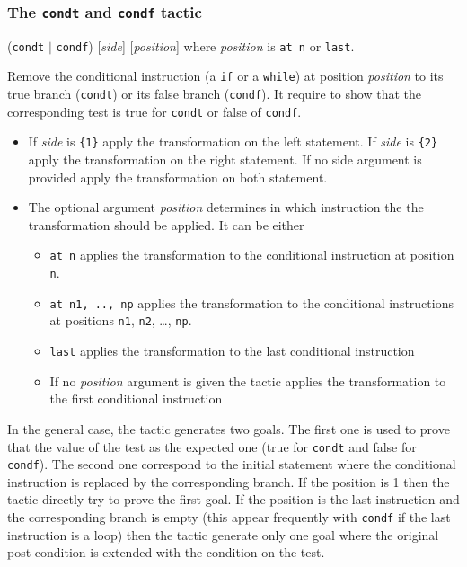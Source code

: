 \subsubsection{The \texttt{condt} and \texttt{condf} tactic}\label{tac:cond} \DONE

\Syntax (\verb+condt+ $|$ \verb+condf+) [\textit{side}] [\textit{position}] 
where \textit{position} is \verb+at n+ or \verb+last+.

\Description Remove the conditional instruction 
(a \verb+if+ or a \verb+while+) at position \textit{position} to
its true branch (\verb+condt+) or its false branch (\verb+condf+).
It require to show that the corresponding test is true for \verb+condt+ 
or false of \verb+condf+.
\begin{itemize}
 \item If \textit{side} is \verb+{1}+ apply the transformation on the left
   statement.  If \textit{side} is \verb+{2}+ apply the transformation on the
   right statement. If no side argument is provided apply the transformation
   on both statement.
 \item The optional argument \textit{position} determines in which instruction the 
  the transformation should be applied. It can be either
  \begin{itemize}
  \item \verb+at n+ applies the transformation to the conditional instruction at 
  position \verb+n+.
  \item \verb+at n1, .., np+ applies the transformation to the conditional instructions 
   at positions \verb+n1+, \verb+n2+, \ldots, \verb+np+. 
  \item \verb+last+ applies the transformation to the last conditional instruction
  \item If no \textit{position} argument is given the tactic applies the transformation
    to the first conditional instruction
  \end{itemize} 
\end{itemize}

In the general case, the tactic generates two goals. The first one is
used to prove that the value of the test as the expected one (true for
\verb+condt+ and false for \verb+condf+). The second one correspond to
the initial statement where the conditional instruction is replaced by
the corresponding branch. If the position is 1 then the tactic
directly try to prove the first goal. If the position is the last
instruction and the corresponding branch is empty (this appear
frequently with \verb+condf+ if the last instruction is a loop) then
the tactic generate only one goal where the original post-condition is
extended with the condition on the test.


